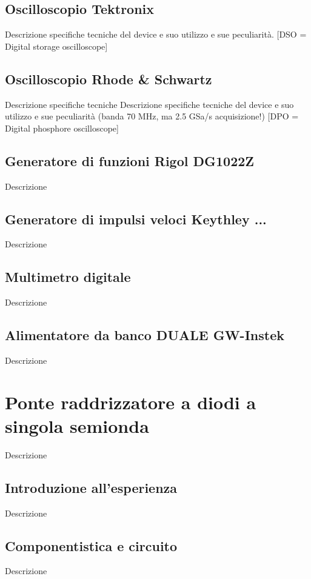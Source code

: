 \documentclass[journal]{IEEEtran}
\begin{document}
\subsection{\textbf{Oscilloscopio Tektronix}}
Descrizione specifiche tecniche del device e suo utilizzo e sue peculiarità. [DSO = Digital storage oscilloscope]

\subsection{\textbf{Oscilloscopio Rhode & Schwartz}}
Descrizione specifiche tecniche 
Descrizione specifiche tecniche del device e suo utilizzo e sue peculiarità (banda 70 MHz, ma 2.5 GSa/s acquisizione!)
[DPO = Digital phosphore oscilloscope]

\subsection{\textbf{Generatore di funzioni Rigol DG1022Z}}
Descrizione

\subsection{\textbf{Generatore di impulsi veloci Keythley ...}}
Descrizione

\subsection{\textbf{Multimetro digitale}}
Descrizione

\subsection{\textbf{Alimentatore da banco DUALE GW-Instek}}
Descrizione

\section{\textbf{Ponte raddrizzatore a diodi a singola semionda}} 
Descrizione

\subsection{\textbf{Introduzione all'esperienza}}
Descrizione

\subsection{\textbf{Componentistica e circuito}}
Descrizione
\end{document}
